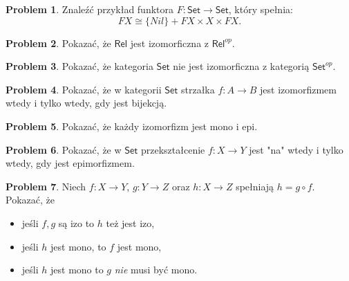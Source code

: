 \documentclass[10pt]{amsart}
\theoremstyle{plain}
\theoremstyle{definition}
\newtheorem{problem}{Problem}
\numberwithin{equation}{section}
\begin{document}
\begin{problem}
Znaleźć przykład funktora $F:\mathsf{Set}\to\mathsf{Set}$, który spełnia:
$$
FX \cong \{Nil\} + FX \times X \times FX.
$$
\end{problem}

\begin{problem}
Pokazać, że $\mathsf{Rel}$ jest izomorficzna z $\mathsf{Rel}^{op}$. 
\end{problem}


\begin{problem}
Pokazać, że kategoria $\mathsf{Set}$ nie jest izomorficzna z kategorią $\mathsf{Set}^{op}$. 
\end{problem}

\begin{problem}
Pokazać, że w kategorii $\mathsf{Set}$ strzałka $f:A\to B$ jest izomorfizmem wtedy i tylko wtedy, gdy jest bijekcją. 
\end{problem}

\begin{problem}
Pokazać, że każdy izomorfizm jest mono i epi.
\end{problem}

\begin{problem}
Pokazać, że w $\mathsf{Set}$ przekształcenie $f:X\to Y$ jest "na" wtedy i tylko wtedy, gdy jest epimorfizmem.
\end{problem}


\begin{problem}
Niech $f:X\to Y$, $g:Y\to Z$ oraz $h:X\to Z$ spełniają $h= g\circ f$. Pokazać, że 
\begin{itemize}
\item jeśli $f,g$ są izo to $h$ też jest izo,
\item jeśli $h$ jest mono, to $f$ jest mono,
\item jeśli $h$ jest mono to $g$ \emph{nie} musi być mono.
\end{itemize}
\end{problem}
\end{document}
